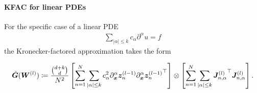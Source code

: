 \paragraph{KFAC for linear PDEs}

For the specific case of a linear PDE 
\begin{align}
    \sum_{\lvert \alpha \rvert\le k} c_\alpha \partial^\alpha u = f
\end{align}
the Kronecker-factored approximation takes the form 
\begin{tcolorbox}[colframe=kfac, title={KFAC for ENGD for a general linear PDE},bottom=0mm,top=0mm,middle=0mm]
\begin{align*}\label{eq:KFAC-PINNs-general}
    \hat{\mG}%
    (\mW^{(l)})
    \coloneqq \frac{\binom{d+k}{d}}{N^2}
    \left[\sum_{n=1}^N \sum_{\lvert \alpha \rvert \le k} %
    c_\alpha^2\partial_\vx^\alpha \vz_n^{(l-1)} {\partial_\vx^\alpha \vz_n^{(l-1)}}^\top\right] 
    \otimes
    \left[\sum_{n=1}^N\sum_{\lvert \alpha \rvert \le k} {\mJ^{(l)}_{n,\alpha}}^\top {\mJ^{(l)}_{n,\alpha}} \right]. 
\end{align*}
\end{tcolorbox}

